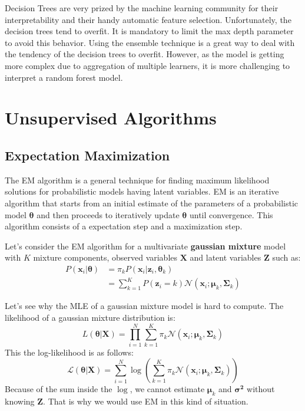 \documentclass[12pt]{report}
\begin{document}
            Decision Trees are very prized by the machine learning community for their interpretability and their handy automatic feature selection. Unfortunately, the decision trees tend to overfit. It is mandatory to limit the max depth parameter to avoid this behavior. Using the ensemble technique is a great way to deal with the tendency of the decision trees to overfit. However, as the model is getting more complex due to aggregation of multiple learners, it is more challenging to interpret a random forest model.
            
    \section{Unsupervised Algorithms}
        \subsection{Expectation Maximization}
            The EM algorithm is a general technique for finding maximum likelihood solutions for probabilistic models having latent variables. EM is an iterative algorithm that starts from an initial estimate of the parameters of a probabilistic model $\boldsymbol{\theta}$ and then proceeds to iteratively update $\boldsymbol{\theta}$ until convergence. This algorithm consists of a expectation step and a maximization step.
            
            Let's consider the EM algorithm for a multivariate \textbf{gaussian mixture} model with $K$ mixture components, observed variables $\boldsymbol{X}$ and latent variables $\boldsymbol{Z}$ such as:
            \begin{align}
                P(\boldsymbol{x}_i | \boldsymbol{\theta}) &= \pi_k P(\boldsymbol{x}_i | \boldsymbol{z}_i, \boldsymbol{\theta}_k)\\
                &= \sum_{k=1}^{K} P(\boldsymbol{z}_i = k) \mathcal{N}(\boldsymbol{x}_i; \boldsymbol{\mu}_k, \boldsymbol{\Sigma}_k)
            \end{align}
            
            Let's see why the MLE of a gaussian mixture model is hard to compute. The likelihood of a gaussian mixture distribution is:
            \begin{equation}
                L(\boldsymbol{\theta} | \boldsymbol{X}) = \prod_{i=1}^N\sum_{k=1}^{K} \pi_k \mathcal{N}(\boldsymbol{x}_i; \boldsymbol{\mu}_k, \boldsymbol{\Sigma}_k)
            \end{equation}
            This the log-likelihood is as follows:
            \begin{equation}
                \mathcal{L}(\boldsymbol{\theta} | \boldsymbol{X}) = \sum_{i=1}^N \log\left(\sum_{k=1}^{K} \pi_k \mathcal{N}(\boldsymbol{x}_i; \boldsymbol{\mu}_k, \boldsymbol{\Sigma}_k)\right)
            \end{equation}
            Because of the sum inside the $\log$, we cannot estimate $\boldsymbol{\mu}_k$ and $\boldsymbol{\sigma^2}$ without knowing $\boldsymbol{Z}$. That is why we would use EM in this kind of situation.
            
\end{document}
